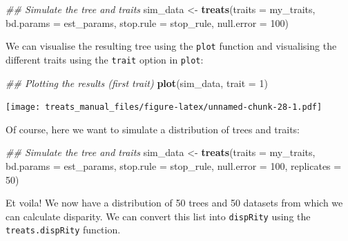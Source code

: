 \documentclass[
]{book}
\newenvironment{Shaded}{\begin{snugshade}}{\end{snugshade}}
\newcommand{\CommentTok}[1]{\textcolor[rgb]{0.56,0.35,0.01}{\textit{#1}}}
\newcommand{\DataTypeTok}[1]{\textcolor[rgb]{0.13,0.29,0.53}{#1}}
\newcommand{\DecValTok}[1]{\textcolor[rgb]{0.00,0.00,0.81}{#1}}
\newcommand{\KeywordTok}[1]{\textcolor[rgb]{0.13,0.29,0.53}{\textbf{#1}}}
\newcommand{\NormalTok}[1]{#1}
\newcommand{\StringTok}[1]{\textcolor[rgb]{0.31,0.60,0.02}{#1}}
\begin{document}
\begin{Shaded}
\begin{Highlighting}[]
\CommentTok{\#\# Simulate the tree and traits}
\NormalTok{sim\_data \textless{}{-}}\StringTok{ }\KeywordTok{treats}\NormalTok{(}\DataTypeTok{traits     =}\NormalTok{ my\_traits,}
                   \DataTypeTok{bd.params  =}\NormalTok{ est\_params,}
                   \DataTypeTok{stop.rule  =}\NormalTok{ stop\_rule,}
                   \DataTypeTok{null.error =} \DecValTok{100}\NormalTok{)}
\end{Highlighting}
\end{Shaded}

We can visualise the resulting tree using the \texttt{plot} function and visualising the different traits using the \texttt{trait} option in \texttt{plot}:

\begin{Shaded}
\begin{Highlighting}[]
\CommentTok{\#\# Plotting the results (first trait)}
\KeywordTok{plot}\NormalTok{(sim\_data, }\DataTypeTok{trait =} \DecValTok{1}\NormalTok{)}
\end{Highlighting}
\end{Shaded}

\texttt{[image: treats\_manual\_files/figure-latex/unnamed-chunk-28-1.pdf]}

Of course, here we want to simulate a distribution of trees and traits:

\begin{Shaded}
\begin{Highlighting}[]
\CommentTok{\#\# Simulate the tree and traits}
\NormalTok{sim\_data \textless{}{-}}\StringTok{ }\KeywordTok{treats}\NormalTok{(}\DataTypeTok{traits     =}\NormalTok{ my\_traits,}
                   \DataTypeTok{bd.params  =}\NormalTok{ est\_params,}
                   \DataTypeTok{stop.rule  =}\NormalTok{ stop\_rule,}
                   \DataTypeTok{null.error =} \DecValTok{100}\NormalTok{,}
                   \DataTypeTok{replicates =} \DecValTok{50}\NormalTok{)}
\end{Highlighting}
\end{Shaded}

Et voila! We now have a distribution of 50 trees and 50 datasets from which we can calculate disparity.
We can convert this list into \texttt{dispRity} using the \texttt{treats.dispRity} function.
\end{document}
